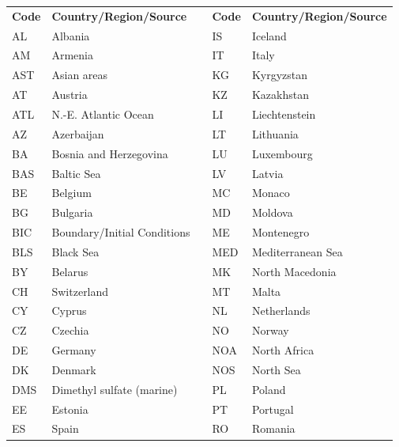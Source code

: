 \begin{table}[!ht]
\begin{center}
\begin{small}
\begin{tabular}{|l|l|c|l|l|}
\cline{1-2} \cline{4-5}
{\rule[-3mm]{0mm}{8mm}\textbf{Code}}&\textbf{Country/Region/Source}&&\textbf{Code}&\textbf{Country/Region/Source}\\  \cline{1-2} \cline{4-5}
AL & Albania & & IS & Iceland \\  \cline{1-2} \cline{4-5}
AM & Armenia & &  IT & Italy\\  \cline{1-2} \cline{4-5}
AST & Asian areas & &  KG & Kyrgyzstan \\  \cline{1-2} \cline{4-5}
AT & Austria & &  KZ & Kazakhstan \\  \cline{1-2} \cline{4-5}
ATL & N.-E. Atlantic Ocean & & LI & Liechtenstein \\  \cline{1-2} \cline{4-5}
AZ & Azerbaijan & & LT & Lithuania\\  \cline{1-2} \cline{4-5}
BA & Bosnia and Herzegovina & & LU & Luxembourg \\  \cline{1-2} \cline{4-5}
BAS & Baltic Sea & & LV & Latvia \\  \cline{1-2} \cline{4-5}
BE & Belgium & &  MC & Monaco\\  \cline{1-2} \cline{4-5}
BG & Bulgaria & & MD & Moldova \\  \cline{1-2} \cline{4-5}
BIC & Boundary/Initial Conditions & & ME & Montenegro \\  \cline{1-2} \cline{4-5}
BLS & Black Sea & & MED & Mediterranean Sea \\  \cline{1-2} \cline{4-5}
BY & Belarus & & MK & North Macedonia \\  \cline{1-2} \cline{4-5}
CH & Switzerland & & MT & Malta \\  \cline{1-2} \cline{4-5}
CY & Cyprus & & NL & Netherlands \\  \cline{1-2} \cline{4-5}
CZ & Czechia & & NO & Norway \\  \cline{1-2} \cline{4-5}
DE & Germany & & NOA & North Africa \\  \cline{1-2} \cline{4-5}
DK & Denmark & & NOS & North Sea \\  \cline{1-2} \cline{4-5}
DMS & Dimethyl sulfate (marine) & & PL & Poland \\  \cline{1-2} \cline{4-5}
EE & Estonia & & PT & Portugal \\  \cline{1-2} \cline{4-5}
ES & Spain & & RO & Romania \\  \cline{1-2} \cline{4-5}

\end{tabular}
\end{small}
\end{center}
\end{table}
